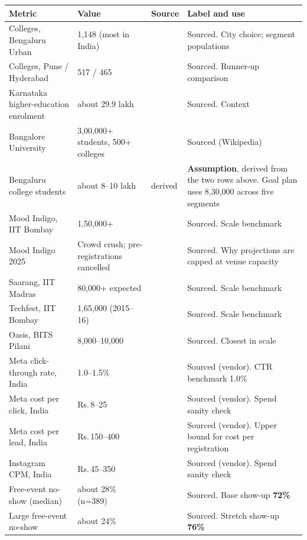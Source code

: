 \documentclass[11pt,a4paper]{article}
\newcommand{\rs}{Rs.\,}
\begin{document}
\begin{longtable}{@{}p{4.3cm}p{4.0cm}p{1.2cm}p{5.6cm}@{}}
\toprule
\textbf{Metric} & \textbf{Value} & \textbf{Source} & \textbf{Label and use} \\
\midrule
\endhead
Colleges, Bengaluru Urban & 1,148 (most in India) & \cite{aishe2024} & Sourced. City choice; segment populations \\
Colleges, Pune / Hyderabad & 517 / 465 & \cite{aishe2024} & Sourced. Runner-up comparison \\
Karnataka higher-education enrolment & about 29.9 lakh & \cite{deccanherald2024} & Sourced. Context \\
Bangalore University & 3,00,000+ students, 500+ colleges & \cite{wikiBangaloreEdu} & Sourced (Wikipedia) \\
Bengaluru college students & about 8--10 lakh & derived & \textbf{Assumption}, derived from the two rows above. Goal plan uses 8,30,000 across five segments \\
Mood Indigo, IIT Bombay & 1,50,000+ & \cite{wikiMoodIndigo} & Sourced. Scale benchmark \\
Mood Indigo 2025 & Crowd crush; pre-registrations cancelled & \cite{careers360MoodIndigo} & Sourced. Why projections are capped at venue capacity \\
Saarang, IIT Madras & 80,000+ expected & \cite{iitmSaarang} & Sourced. Scale benchmark \\
Techfest, IIT Bombay & 1,65,000 (2015--16) & \cite{wikiTechfest} & Sourced. Scale benchmark \\
Oasis, BITS Pilani & 8,000--10,000 & \cite{wikiOasis} & Sourced. Closest in scale \\
Meta click-through rate, India & 1.0--1.5\% & \cite{owlclawMeta} & Sourced (vendor). CTR benchmark 1.0\% \\
Meta cost per click, India & \rs8--25 & \cite{owlclawMeta} & Sourced (vendor). Spend sanity check \\
Meta cost per lead, India & \rs150--400 & \cite{owlclawMeta} & Sourced (vendor). Upper bound for cost per registration \\
Instagram CPM, India & \rs45--350 & \cite{upgrowthInsta} & Sourced (vendor). Spend sanity check \\
Free-event no-show (median) & about 28\% (n=389) & \cite{pheedloop5} & Sourced. Base show-up \textbf{72\%} \\
Large free-event no-show & about 24\% & \cite{pheedloop5} & Sourced. Stretch show-up \textbf{76\%} \\

\end{longtable}
\end{document}
